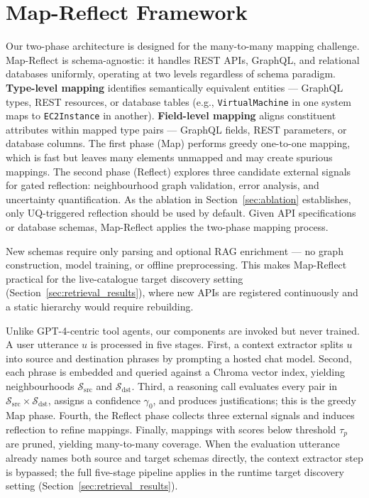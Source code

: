 \documentclass[sigconf, nonacm]{acmart}
\begin{document}
\section{Map-Reflect Framework}
\label{sec:mapreflect}

Our two-phase architecture is designed for the many-to-many mapping challenge. Map-Reflect is schema-agnostic: it handles REST APIs, GraphQL, and relational databases uniformly, operating at two levels regardless of schema paradigm. \textbf{Type-level mapping} identifies semantically equivalent entities — GraphQL types, REST resources, or database tables (e.g., \texttt{VirtualMachine} in one system maps to \texttt{EC2Instance} in another). \textbf{Field-level mapping} aligns constituent attributes within mapped type pairs — GraphQL fields, REST parameters, or database columns. The first phase (Map) performs greedy one-to-one mapping, which is fast but leaves many elements unmapped and may create spurious mappings. The second phase (Reflect) explores three candidate external signals for gated reflection: neighbourhood graph validation, error analysis, and uncertainty quantification. As the ablation in Section~\ref{sec:ablation} establishes, only UQ-triggered reflection should be used by default. Given API specifications or database schemas, Map-Reflect applies the two-phase mapping process.

New schemas require only parsing and optional RAG enrichment — no graph construction, model training, or offline preprocessing. This makes Map-Reflect practical for the live-catalogue target discovery setting (Section~\ref{sec:retrieval_results}), where new APIs are registered continuously and a static hierarchy would require rebuilding.

Unlike GPT-4-centric tool agents, our components are invoked but never trained. A user utterance $u$ is processed in five stages. First, a context extractor splits $u$ into source and destination phrases by prompting a hosted chat model. Second, each phrase is embedded and queried against a Chroma vector index, yielding neighbourhoods $\mathcal{S}_{\mathrm{src}}$ and $\mathcal{S}_{\mathrm{dst}}$. Third, a reasoning call evaluates every pair in $\mathcal{S}_{\mathrm{src}}\times\mathcal{S}_{\mathrm{dst}}$, assigns a confidence $\gamma_0$, and produces justifications; this is the greedy Map phase. Fourth, the Reflect phase collects three external signals and induces reflection to refine mappings. Finally, mappings with scores below threshold $\tau_p$ are pruned, yielding many-to-many coverage. When the evaluation utterance already names both source and target schemas directly, the context extractor step is bypassed; the full five-stage pipeline applies in the runtime target discovery setting (Section~\ref{sec:retrieval_results}).
\end{document}
